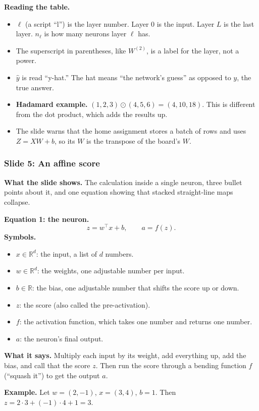 \textbf{Reading the table.}
\begin{itemize}
\item $\ell$ (a script ``l'') is the layer number. Layer $0$ is the input. Layer $L$ is the last layer. $n_\ell$ is how many neurons layer $\ell$ has.
\item The superscript in parentheses, like $W^{(2)}$, is a label for the layer, not a power.
\item $\hat{y}$ is read ``y-hat.'' The hat means ``the network's guess'' as opposed to $y$, the true answer.
\item \textbf{Hadamard example.} $(1,2,3)\odot(4,5,6) = (4,10,18)$. This is different from the dot product, which adds the results up.
\item The slide warns that the home assignment stores a batch of rows and uses $Z = XW + b$, so its $W$ is the transpose of the board's $W$.
\end{itemize}

\subsubsection{Slide 5: An affine score}

\textbf{What the slide shows.} The calculation inside a single neuron, three bullet points about it, and one equation showing that stacked straight-line maps collapse.

\textbf{Equation 1: the neuron.}
\[
z = w^\top x + b, \qquad a = f(z).
\]
\textbf{Symbols.}
\begin{itemize}
\item $x \in \mathbb{R}^d$: the input, a list of $d$ numbers.
\item $w \in \mathbb{R}^d$: the weights, one adjustable number per input.
\item $b \in \mathbb{R}$: the bias, one adjustable number that shifts the score up or down.
\item $z$: the score (also called the pre-activation).
\item $f$: the activation function, which takes one number and returns one number.
\item $a$: the neuron's final output.
\end{itemize}
\textbf{What it says.} Multiply each input by its weight, add everything up, add the bias, and call that the score $z$. Then run the score through a bending function $f$ (``squash it'') to get the output $a$.

\textbf{Example.} Let $w = (2,-1)$, $x = (3,4)$, $b = 1$. Then $z = 2\cdot3 + (-1)\cdot4 + 1 = 3$.

